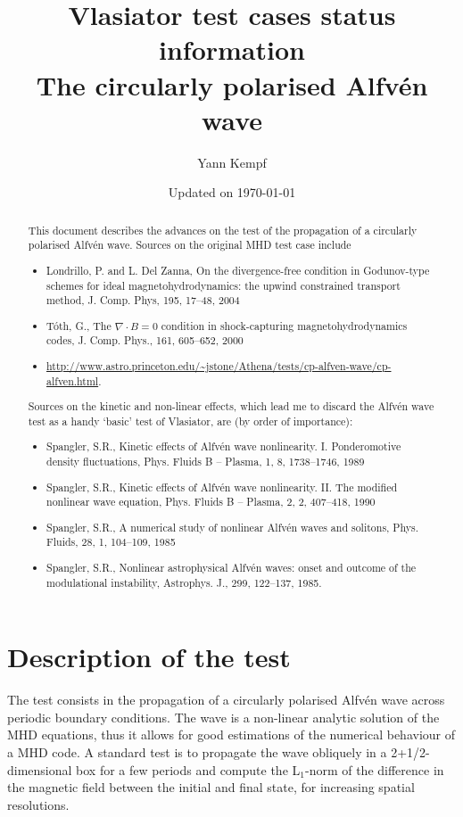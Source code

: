 \documentclass[a4paper,10pt]{scrartcl}
\title{
\Huge{Vlasiator test cases status information} \\
\LARGE{The circularly polarised Alfvén wave}
}
\author{Yann Kempf}
\date{Updated on \today}
\begin{document}
\maketitle

\begin{abstract}
This document describes the advances on the test of the propagation of a circularly polarised Alfvén wave. Sources on the original MHD test case include
\begin{itemize}
 \item Londrillo, P. and L. Del Zanna, On the divergence-free condition in Godunov-type schemes for ideal magnetohydrodynamics: the upwind constrained transport method, J. Comp. Phys, 195, 17--48, 2004
 \item Tóth, G., The $\nabla \cdot B = 0$ condition in shock-capturing magnetohydrodynamics codes, J. Comp. Phys., 161, 605--652, 2000
 \item \url{http://www.astro.princeton.edu/~jstone/Athena/tests/cp-alfven-wave/cp-alfven.html}.
\end{itemize}

Sources on the kinetic and non-linear effects, which lead me to discard the Alfvén wave test as a handy `basic' test of Vlasiator, are (by order of importance):
\begin{itemize}
 \item Spangler, S.R., Kinetic effects of Alfvén wave nonlinearity. I. Ponderomotive density fluctuations, Phys. Fluids B -- Plasma, 1, 8, 1738--1746, 1989
 \item Spangler, S.R., Kinetic effects of Alfvén wave nonlinearity. II. The modified nonlinear wave equation, Phys. Fluids B -- Plasma, 2, 2, 407--418, 1990
 \item Spangler, S.R., A numerical study of nonlinear Alfvén waves and solitons, Phys. Fluids, 28, 1, 104--109, 1985
 \item Spangler, S.R., Nonlinear astrophysical Alfvén waves: onset and outcome of the modulational instability, Astrophys. J., 299, 122--137, 1985.
\end{itemize}

\end{abstract}


\section{Description of the test}
The test consists in the propagation of a circularly polarised Alfvén wave across periodic boundary conditions. The wave is a non-linear analytic solution of the MHD equations, thus it allows for good estimations of the numerical behaviour of a MHD code. A standard test is to propagate the wave obliquely in a 2+1/2-dimensional box for a few periods and compute the L$_1$-norm of the difference in the magnetic field between the initial and final state, for increasing spatial resolutions.
\end{document}
